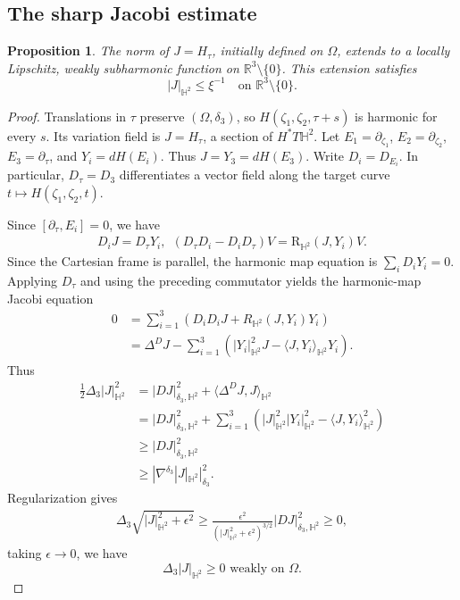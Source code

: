 \documentclass[letterpaper]{amsart}
\newtheorem{prop}[thm]{Proposition}
\theoremstyle{definition}
\theoremstyle{remark}
\begin{document}
\subsection{The sharp Jacobi estimate}\label{subsec-jacobi}
\begin{prop}\label{prop-jacobi}
The norm of $J=H_\tau$, initially defined on $\Omega$, extends to a locally
Lipschitz, weakly subharmonic function on $\mathbb R^3\setminus\{0\}$.
This extension satisfies
\[
 |J|_{\mathbb H^2}\le\xi^{-1}
 \quad\text{on }\mathbb R^3\setminus\{0\}.
\]
\end{prop}
\begin{proof}
Translations in $\tau$ preserve $(\Omega,\delta_3)$, so $H(\zeta_1,\zeta_2,\tau+s)$ is harmonic for every $s$. Its variation field is $J=H_\tau$, a section of $H^*T\mathbb H^2$. Let $E_1=\partial_{\zeta_1}$, $E_2=\partial_{\zeta_2}$, $E_3=\partial_\tau$, and $Y_i=dH(E_i)$. Thus $J=Y_3=dH(E_3)$. Write $D_i=D_{E_i}$. In particular, $D_\tau=D_3$ differentiates a vector field along the target curve $t\mapsto H(\zeta_1,\zeta_2,t)$.

Since $[\partial _{\tau }, E_i] =0$, we have
\begin{align*}
	D_i J = D_{\tau } Y_i,\ \ (D_{\tau }D_{i} - D_{i} D_{\tau }) V= \mathrm{R}_{\mathbb{H}^2}(J, Y_i) V.
\end{align*} 
Since the Cartesian frame is parallel, the harmonic map equation is $\sum_i D_iY_i=0$. Applying $D_\tau$ and using the preceding commutator yields the harmonic-map Jacobi equation
\begin{align*}
	0 &= \sum_{i=1}^{3} (D_iD_i J + R_{\mathbb{H}^2}(J, Y_i) Y_i)\\
	&= \Delta ^{D} J - \sum_{i=1}^{3} \left( |Y_i|^2_{\mathbb{H}^2} J - \langle J, Y_i \rangle_{\mathbb{H}^2} Y_i \right)  . 
\end{align*} 
Thus
\begin{align*}
	\frac{1}{2} \Delta _{3}|J|^2_{\mathbb{H}^2} &= |D J|^2_{\delta _3, \mathbb{H}^2} + \langle \Delta ^{D} J, J \rangle_{\mathbb{H}^2}\\
						    &= |D J|^2_{\delta _3, \mathbb{H}^2} + \sum_{i=1}^{3} \left( |J|^2_{\mathbb{H}^2} |Y_i|^2_{\mathbb{H}^2} - \langle J, Y_i \rangle_{\mathbb{H}^2}^2\right) \\
						    &\geq |D J|^2_{\delta _3, \mathbb{H}^2}\\
						    & \geq |\nabla ^{\delta _3} |J|_{\mathbb{H}^2}|^2_{\delta _3}.
\end{align*} 
Regularization gives
\begin{align*}
	\Delta _{3} \sqrt{|J|^2_{\mathbb{H}^2} + \epsilon ^2} \geq \frac{\epsilon ^2}{(|J|^2_{\mathbb{H}^2} + \epsilon ^2) ^{3 /2} } |D J|^2_{\delta _3, \mathbb{H}^2} \geq 0,
\end{align*} 
taking $\epsilon \to 0$, we have 
$$\Delta _3 |J|_{\mathbb{H}^2} \geq 0 \text{ weakly on } \Omega .$$


\end{proof}
\end{document}
